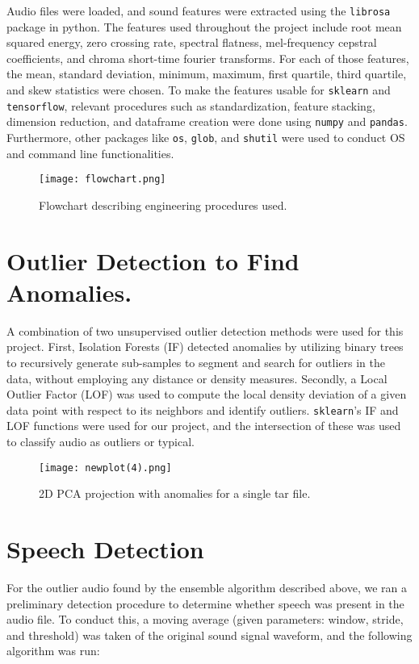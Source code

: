 \documentclass[letterpaper, 12pt]{article}
\begin{document}
Audio files were loaded, and sound features were extracted using the \texttt{librosa} package in python. The features used throughout the project include root mean squared energy, zero crossing rate, spectral flatness, mel-frequency cepstral coefficients, and chroma short-time fourier transforms. For each of those features, the mean, standard deviation, minimum, maximum, first quartile, third quartile, and skew statistics were chosen. To make the features usable for \texttt{sklearn} and \texttt{tensorflow}, relevant procedures such as standardization, feature stacking, dimension reduction, and dataframe creation were done using \texttt{numpy} and \texttt{pandas}. Furthermore, other packages like \texttt{os}, \texttt{glob}, and \texttt{shutil} were used to conduct OS and command line functionalities.

\begin{figure}[h]
    \centering
    \texttt{[image: flowchart.png]}
    \caption{Flowchart describing engineering procedures used.}
\end{figure} 

\newpage
\section{Outlier Detection to Find Anomalies.}

A combination of two unsupervised outlier detection methods were used for this project. First, Isolation Forests (IF) detected anomalies by utilizing binary trees to recursively generate sub-samples to segment and search for outliers in the data, without employing any distance or density measures. Secondly, a Local Outlier Factor (LOF) was used to compute the local density deviation of a given data point with respect to its neighbors and identify outliers. \texttt{sklearn}'s IF and LOF functions were used for our project, and the intersection of these was used to classify audio as outliers or typical.

\begin{figure}[h]
    \centering
    \texttt{[image: newplot(4).png]}
    \caption{2D PCA projection with anomalies for a single tar file.}
\end{figure} 

\newpage
\section{Speech Detection}

For the outlier audio found by the ensemble algorithm described above, we ran a preliminary detection procedure to determine whether speech was present in the audio file. To conduct this, a moving average (given parameters: window, stride, and threshold) was taken of the original sound signal waveform, and the following algorithm was run:
\end{document}
